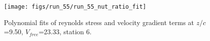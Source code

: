 \begin{figure}[H]
\centering
\texttt{[image: figs/run\_55/run\_55\_nut\_ratio\_fit]}
\caption{Polynomial fits of reynolds stress and velocity gradient terms at $z/c$=9.50, $V_{free}$=23.33, station 6.}
\label{fig:run_55_nut_ratio_fit}
\end{figure}


